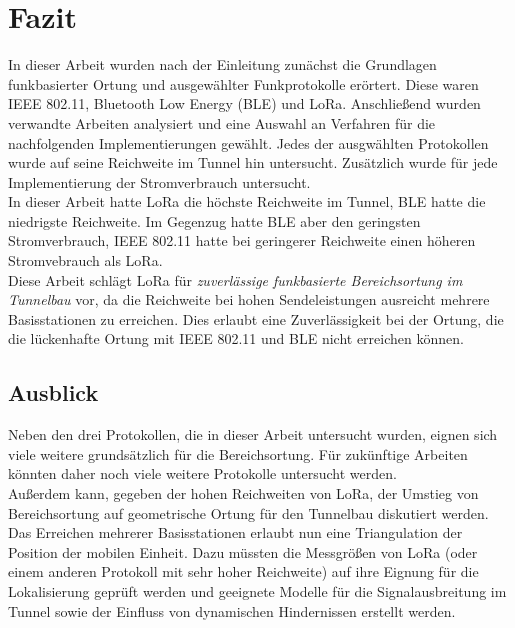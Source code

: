 \chapter{Fazit}
\label{ch:fazit}
In dieser Arbeit wurden nach der Einleitung zunächst die Grundlagen funkbasierter Ortung und ausgewählter Funkprotokolle erörtert.
Diese waren IEEE 802.11, Bluetooth Low Energy (BLE) und LoRa.
Anschließend wurden verwandte Arbeiten analysiert und eine Auswahl an Verfahren für die nachfolgenden Implementierungen gewählt.
Jedes der ausgwählten Protokollen wurde auf seine Reichweite im Tunnel hin untersucht.
Zusätzlich wurde für jede Implementierung der Stromverbrauch untersucht.\\
In dieser Arbeit hatte LoRa die höchste Reichweite im Tunnel, BLE hatte die niedrigste Reichweite.
Im Gegenzug hatte BLE aber den geringsten Stromverbrauch, IEEE 802.11 hatte bei geringerer Reichweite einen höheren Stromvebrauch als LoRa.\\
Diese Arbeit schlägt LoRa für \emph{zuverlässige funkbasierte Bereichsortung im Tunnelbau} vor, da die Reichweite bei hohen Sendeleistungen ausreicht mehrere Basisstationen zu erreichen. 
Dies erlaubt eine Zuverlässigkeit bei der Ortung, die die lückenhafte Ortung mit IEEE 802.11 und BLE nicht erreichen können.

\section{Ausblick}
Neben den drei Protokollen, die in dieser Arbeit untersucht wurden, eignen sich viele weitere grundsätzlich für die Bereichsortung.
Für zukünftige Arbeiten könnten daher noch viele weitere Protokolle untersucht werden. \\
Außerdem kann, gegeben der hohen Reichweiten von LoRa, der Umstieg von Bereichsortung auf geometrische Ortung für den Tunnelbau diskutiert werden. 
Das Erreichen mehrerer Basisstationen erlaubt nun eine Triangulation der Position der mobilen Einheit.
Dazu müssten die Messgrößen von LoRa (oder einem anderen Protokoll mit sehr hoher Reichweite) auf ihre Eignung für die Lokalisierung geprüft werden und geeignete Modelle für die Signalausbreitung im Tunnel sowie der Einfluss von dynamischen Hindernissen erstellt werden.

